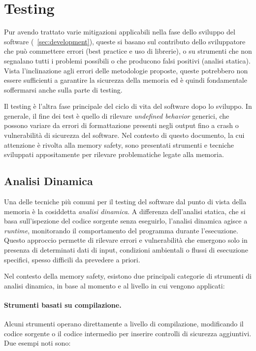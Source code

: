\section{Testing}
\label{sec:testing}

Pur avendo trattato varie mitigazioni applicabili nella fase dello sviluppo del software
(~\autoref{sec:development}), queste si basano sul contributo dello sviluppatore
che può commettere errori (best practice e uso di librerie), o su strumenti che
non segnalano tutti i problemi possibili o che producono falsi positivi (analisi
statica). Vista l'inclinazione agli errori delle metodologie proposte, queste
potrebbero non essere sufficienti a garantire la sicurezza della memoria ed è
quindi fondamentale soffermarsi anche sulla parte di testing.

Il testing è l'altra fase principale del ciclo di vita del software dopo lo
sviluppo. In generale, il fine dei test è quello di rilevare \textit{undefined
behavior} generici, che possono variare da errori di formattazione presenti
negli output fino a crash o vulnerabilità di sicurezza del software. Nel contesto
di questo documento, la cui attenzione è rivolta alla memory safety, sono presentati
strumenti e tecniche sviluppati appositamente per rilevare problematiche legate alla
memoria.

\subsection{Analisi Dinamica}
\label{sec:analisi-dinamica}

Una delle tecniche più comuni per il testing del software dal punto di vista
della memoria è la cosiddetta \textit{analisi dinamica}. A differenza dell'analisi
statica, che si basa sull'ispezione del codice sorgente senza eseguirlo, l'analisi
dinamica agisce a \textit{runtime}, monitorando il comportamento del programma
durante l'esecuzione. Questo approccio permette di rilevare errori e vulnerabilità
che emergono solo in presenza di determinati dati di input, condizioni
ambientali o flussi di esecuzione specifici, spesso difficili da prevedere a priori.

Nel contesto della memory safety, esistono due principali categorie di strumenti
di analisi dinamica, in base al momento e al livello in cui vengono applicati:

\paragraph{Strumenti basati su compilazione.}
Alcuni strumenti operano direttamente a livello di compilazione, modificando il codice
sorgente o il codice intermedio per inserire controlli di sicurezza aggiuntivi.
Due esempi noti sono:

